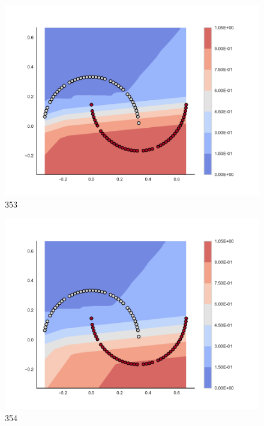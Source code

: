 \begin{subfigure}[b]{0.09\textwidth}
    \includegraphics[clip, trim=2.35cm 1.75cm 4.5cm 0cm,width=\textwidth]{img/convergence/353.pdf}
    \caption{353}
    \label{fig:convergence_353}
\end{subfigure}
%
\begin{subfigure}[b]{0.09\textwidth}
    \includegraphics[clip, trim=2.35cm 1.75cm 4.5cm 0cm,width=\textwidth]{img/convergence/354.pdf}
    \caption{354}
    \label{fig:convergence_354}
\end{subfigure}
%
